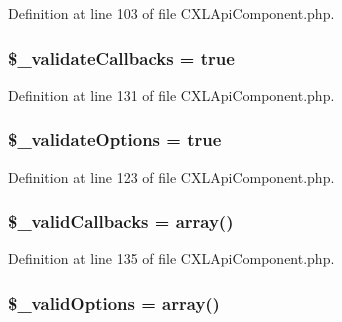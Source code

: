 Definition at line 103 of file CXLApiComponent.php.

\hypertarget{classCXLApiComponent_a73fdad41769f4f4ef1ebeaba5380ffad}{
\subsubsection[{\$\_\-validateCallbacks}]{\setlength{\rightskip}{0pt plus 5cm}\$\_\-validateCallbacks = true}}
\label{classCXLApiComponent_a73fdad41769f4f4ef1ebeaba5380ffad}


Definition at line 131 of file CXLApiComponent.php.

\hypertarget{classCXLApiComponent_a06b741ce121a93d6010e3c514edba22b}{
\subsubsection[{\$\_\-validateOptions}]{\setlength{\rightskip}{0pt plus 5cm}\$\_\-validateOptions = true}}
\label{classCXLApiComponent_a06b741ce121a93d6010e3c514edba22b}


Definition at line 123 of file CXLApiComponent.php.

\hypertarget{classCXLApiComponent_aadd5e6fdc7ba1ec3b3e4a916c4f005d0}{
\subsubsection[{\$\_\-validCallbacks}]{\setlength{\rightskip}{0pt plus 5cm}\$\_\-validCallbacks = array()}}
\label{classCXLApiComponent_aadd5e6fdc7ba1ec3b3e4a916c4f005d0}


Definition at line 135 of file CXLApiComponent.php.

\hypertarget{classCXLApiComponent_afe1adfd2c4c57954ea5230cae01d1c47}{
\subsubsection[{\$\_\-validOptions}]{\setlength{\rightskip}{0pt plus 5cm}\$\_\-validOptions = array()}}
\label{classCXLApiComponent_afe1adfd2c4c57954ea5230cae01d1c47}


